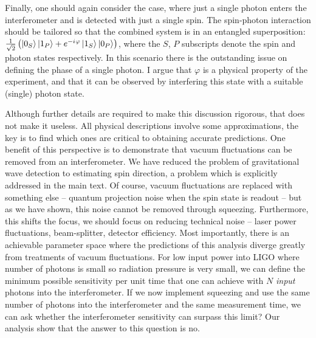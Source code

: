 \documentclass[reqno]{amsart}
\newcommand{\ket}[1]{\left| #1 \right>}
\newcommand{\iu}{{i\mkern1mu}}
\begin{document}
Finally, one should again consider the case, where just a single photon enters the interferometer and is detected with just a single spin. The spin-photon interaction should be tailored so that the combined system is in an entangled superposition: $\frac{1}{\sqrt{2}}\left(\ket{0_S}\ket{1_P}+e^{-\iu \varphi}\ket{1_S}\ket{0_P}\right)$, where the $S$, $P$ subscripts denote the spin and photon states respectively. In this scenario there is the outstanding issue on defining the phase of a single photon. I argue that $\varphi$ is a physical property of the experiment, and that it can be observed by interfering this state with a suitable (single) photon state.

Although further details are required to make this discussion rigorous, that does not make it useless. All physical descriptions involve some approximations, the key is to find which ones are critical to obtaining accurate predictions. One benefit of this perspective is to demonstrate that vacuum fluctuations can be removed from an interferometer. We have reduced the problem of gravitational wave detection to estimating spin direction, a problem which is explicitly addressed in the main text. Of course, vacuum fluctuations are replaced with something else -- quantum projection noise when the spin state is readout -- but as we have shown, this noise cannot be removed through squeezing. Furthermore, this shifts the focus, we should focus on reducing technical noise -- laser power fluctuations, beam-splitter, detector efficiency. Most importantly, there is an achievable parameter space where the predictions of this analysis diverge greatly from treatments of vacuum fluctuations. For low input power into LIGO where number of photons is small so radiation pressure is very small, we can define the minimum possible sensitivity per unit time that one can achieve with $N$ \textit{input} photons into the interferometer. If we now implement squeezing and use the same number of  photons into the interferometer and the same measurement time, we can ask whether the interferometer sensitivity can surpass this limit? Our analysis show that the answer to this question is no.


\end{document}
